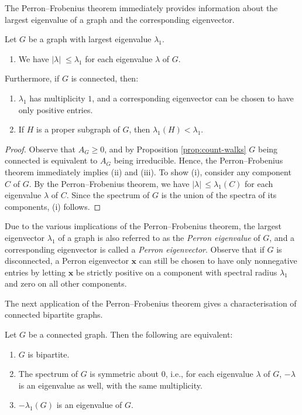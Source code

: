 The Perron--Frobenius theorem immediately provides information about the largest eigenvalue of a graph and the corresponding eigenvector.
\begin{proposition} \label{prop:perron-frobenius}
    Let $G$ be a graph with largest eigenvalue $\lambda_1$.
    \begin{enumerate}
        \item We have $|\lambda|\; \le \lambda_1$ for each eigenvalue $\lambda$ of $G$.
    \end{enumerate}
    Furthermore, if $G$ is connected, then:
    \begin{enumerate}[resume]
        \item $\lambda_1$ has multiplicity $1$, and a corresponding eigenvector can be chosen to have only positive entries.
        \item If $H$ is a proper subgraph of $G$, then $\lambda_1 (H) < \lambda_1$.
    \end{enumerate}
\end{proposition}

\begin{proof}
    Observe that $A_G \ge 0$, and by Proposition \ref{prop:count-walks} $G$ being connected is equivalent to $A_G$ being irreducible.
    Hence, the Perron--Frobenius theorem immediately implies (ii) and (iii).
    To show (i), consider any component $C$ of $G$.
    By the Perron--Frobenius theorem, we have $|\lambda|\, \le \lambda_1 (C)$ for each eigenvalue $\lambda$ of $C$.
    Since the spectrum of $G$ is the union of the spectra of its components, (i) follows.
\end{proof}

Due to the various implications of the Perron--Frobenius theorem, the largest eigenvector $\lambda_1$ of a graph is also referred to as the \textit{Perron eigenvalue} of $G$, and a corresponding eigenvector is called a \textit{Perron eigenvector}.
Observe that if $G$ is disconnected, a Perron eigenvector $\bm x$ can still be chosen to have only nonnegative entries by letting $\bm x$ be strictly positive on a component with spectral radius $\lambda_1$ and zero on all other components.

The next application of the Perron--Frobenius theorem gives a characterisation of connected bipartite graphs.
\begin{proposition}
    Let $G$ be a connected graph. Then the following are equivalent:
    \begin{enumerate}
        \item $G$ is bipartite.
        \item The spectrum of $G$ is symmetric about $0$, i.e., for each eigenvalue $\lambda$ of $G$, $-\lambda$ is an eigenvalue as well, with the same multiplicity.
        \item $-\lambda_1(G)$ is an eigenvalue of $G$.
    \end{enumerate}
\end{proposition}

